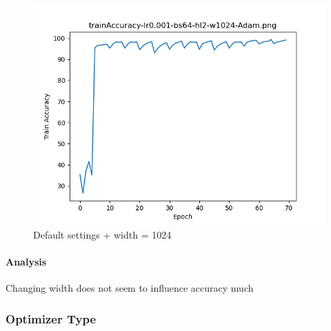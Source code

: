 \documentclass{article}[12pt]
\begin{document}
    \begin{figure}[H]
        \includegraphics[width=\linewidth]{testsResults/trainAccuracy/trainAccuracy-lr0.001-bs64-hl2-w1024-Adam.png}
        \caption{Default settings + width = 1024}
        \endminipage
    \end{figure}

    \paragraph{Analysis} Changing width does not seem to influence accuracy much

\subsubsection{Optimizer Type}
\end{document}
